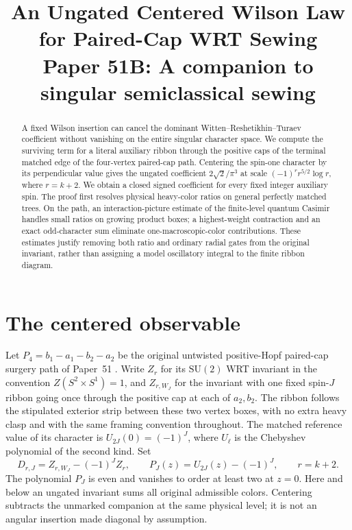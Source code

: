 \documentclass[11pt]{article}
\title{An Ungated Centered Wilson Law for Paired-Cap WRT Sewing\\[4pt]
\large Paper 51B: A companion to singular semiclassical sewing}
\author{}
\date{}
\begin{document}
\maketitle
\begin{abstract}
A fixed Wilson insertion can cancel the dominant Witten--Reshetikhin--Turaev coefficient without vanishing on the entire singular character space. We compute the surviving term for a literal auxiliary ribbon through the positive caps of the terminal matched edge of the four-vertex paired-cap path. Centering the spin-one character by its perpendicular value gives the ungated coefficient \(2\sqrt2/\pi^3\) at scale \((-1)^r r^{5/2}\log r\), where \(r=k+2\). We obtain a closed signed coefficient for every fixed integer auxiliary spin. The proof first resolves physical heavy-color ratios on general perfectly matched trees. On the path, an interaction-picture estimate of the finite-level quantum Casimir handles small ratios on growing product boxes; a highest-weight contraction and an exact odd-character sum eliminate one-macroscopic-color contributions. These estimates justify removing both ratio and ordinary radial gates from the original invariant, rather than assigning a model oscillatory integral to the finite ribbon diagram.
\end{abstract}

\section{The centered observable}

Let \(P_4=b_1-a_1-b_2-a_2\) be the original untwisted positive-Hopf paired-cap surgery path of Paper~51 \cite{p51}. Write \(Z_r\) for its \(\mathrm{SU}(2)\) WRT invariant in the convention \(Z(S^2\times S^1)=1\), and \(Z_{r,W_J}\) for the invariant with one fixed spin-\(J\) ribbon going once through the positive cap at each of \(a_2,b_2\). The ribbon follows the stipulated exterior strip between these two vertex boxes, with no extra heavy clasp and with the same framing convention throughout. The matched reference value of its character is \(U_{2J}(0)=(-1)^J\), where \(U_\ell\) is the Chebyshev polynomial of the second kind. Set
\[
        D_{r,J}=Z_{r,W_J}-(-1)^J Z_r,\qquad P_J(z)=U_{2J}(z)-(-1)^J,\qquad r=k+2.
\]
The polynomial $P_J$ is even and vanishes to order at least two at $z=0$. Here and below an ungated invariant sums all original admissible colors. Centering subtracts the unmarked companion at the same physical level; it is not an angular insertion made diagonal by assumption.
\end{document}

